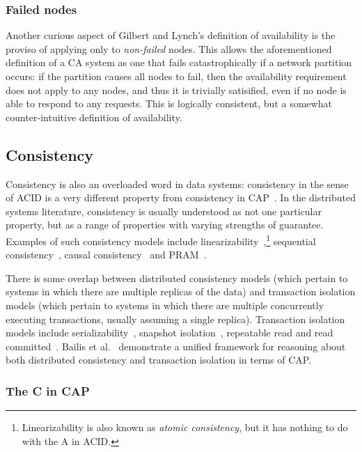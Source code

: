 \documentclass[a4paper,twocolumn,10pt]{article}
\begin{document}
\subsubsection{Failed nodes}

Another curious aspect of Gilbert and Lynch's definition of availability is the proviso of applying
only to \emph{non-failed} nodes. This allows the aforementioned definition of a CA system as one
that fails catastrophically if a network partition occurs: if the partition causes all nodes to
fail, then the availability requirement does not apply to any nodes, and thus it is trivially
satisified, even if no node is able to respond to any requests. This is logically consistent, but a
somewhat counter-intuitive definition of availability.

\subsection{Consistency}\label{sec:consistency}

Consistency is also an overloaded word in data systems: consistency in the sense of ACID is a very
different property from consistency in CAP~\cite{Brewer2012ba}. In the distributed systems
literature, consistency is usually understood as not one particular property, but as a range of
properties with varying strengths of guarantee. Examples of such consistency models include
linearizability~\cite{Herlihy1990jq},\footnote{Linearizability is also known as \emph{atomic
consistency}, but it has nothing to do with the A in ACID.} sequential
consistency~\cite{Lamport1979ky}, causal consistency~\cite{Ahamad1995gl} and
PRAM~\cite{Lipton1988uh}.

There is some overlap between distributed consistency models (which pertain to systems in which
there are multiple replicas of the data) and transaction isolation models (which pertain to systems
in which there are multiple concurrently executing transactions, usually assuming a single replica).
Transaction isolation models include serializability~\cite{Bernstein1987va}, snapshot
isolation~\cite{Berenson1995kj}, repeatable read and read committed~\cite{Gray1976us}. Bailis et
al.~\cite{Bailis2014vc} demonstrate a unified framework for reasoning about both distributed
consistency and transaction isolation in terms of CAP.

\subsubsection{The C in CAP}
\end{document}
